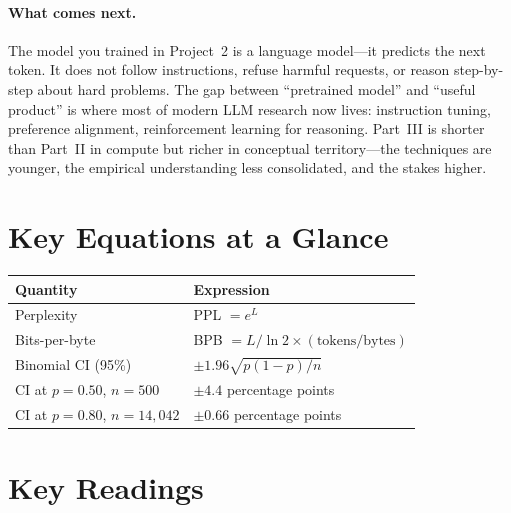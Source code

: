 \paragraph{What comes next.} The model you trained in Project~2 is a language model---it predicts the next token. It does not follow instructions, refuse harmful requests, or reason step-by-step about hard problems. The gap between ``pretrained model'' and ``useful product'' is where most of modern LLM research now lives: instruction tuning, preference alignment, reinforcement learning for reasoning. Part~III is shorter than Part~II in compute but richer in conceptual territory---the techniques are younger, the empirical understanding less consolidated, and the stakes higher.


\section*{Key Equations at a Glance}

\begin{center}
\begin{tabularx}{\textwidth}{@{}p{5cm}X@{}}
\toprule
\textbf{Quantity} & \textbf{Expression} \\
\midrule
Perplexity & PPL $= e^L$ \\
Bits-per-byte & BPB $= L / \ln 2 \times (\text{tokens}/\text{bytes})$ \\
Binomial CI (95\%) & $\pm 1.96\sqrt{p(1-p)/n}$ \\
CI at $p = 0.50$, $n = 500$ & $\pm 4.4$ percentage points \\
CI at $p = 0.80$, $n = 14{,}042$ & $\pm 0.66$ percentage points \\
\bottomrule
\end{tabularx}
\end{center}


\section*{Key Readings}

